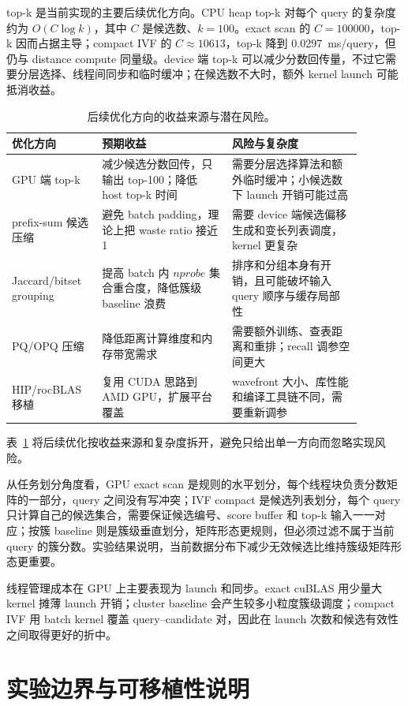 \documentclass[10pt,a4paper]{article}
\newcommand{\msq}{ms/query}
\begin{document}
top-k 是当前实现的主要后续优化方向。CPU heap top-k 对每个 query 的复杂度约为 $O(C\log k)$，其中 $C$ 是候选数、$k=100$。exact scan 的 $C=100000$，top-k 因而占据主导；compact IVF 的 $C\approx10613$，top-k 降到 0.0297~\msq{}，但仍与 distance compute 同量级。device 端 top-k 可以减少分数回传量，不过它需要分层选择、线程间同步和临时缓冲；在候选数不大时，额外 kernel launch 可能抵消收益。

\begin{table}[H]
\centering
\small
\caption{后续优化方向的收益来源与潜在风险。}
\label{tab:future-work}
\begin{tabular}{p{0.22\linewidth}p{0.33\linewidth}p{0.33\linewidth}}
\toprule
优化方向 & 预期收益 & 风险与复杂度 \\
\midrule
GPU 端 top-k & 减少候选分数回传，只输出 top-100；降低 host top-k 时间 & 需要分层选择算法和额外临时缓冲；小候选数下 launch 开销可能过高 \\
prefix-sum 候选压缩 & 避免 batch padding，理论上把 waste ratio 接近 1 & 需要 device 端候选偏移生成和变长列表调度，kernel 更复杂 \\
Jaccard/bitset grouping & 提高 batch 内 $nprobe$ 集合重合度，降低簇级 baseline 浪费 & 排序和分组本身有开销，且可能破坏输入 query 顺序与缓存局部性 \\
PQ/OPQ 压缩 & 降低距离计算维度和内存带宽需求 & 需要额外训练、查表距离和重排；recall 调参空间更大 \\
HIP/rocBLAS 移植 & 复用 CUDA 思路到 AMD GPU，扩展平台覆盖 & wavefront 大小、库性能和编译工具链不同，需要重新调参 \\
\bottomrule
\end{tabular}
\end{table}
表~\ref{tab:future-work} 将后续优化按收益来源和复杂度拆开，避免只给出单一方向而忽略实现风险。

从任务划分角度看，GPU exact scan 是规则的水平划分，每个线程块负责分数矩阵的一部分，query 之间没有写冲突；IVF compact 是候选列表划分，每个 query 只计算自己的候选集合，需要保证候选编号、score buffer 和 top-k 输入一一对应；按簇 baseline 则是簇级垂直划分，矩阵形态更规则，但必须过滤不属于当前 query 的簇分数。实验结果说明，当前数据分布下减少无效候选比维持簇级矩阵形态更重要。

线程管理成本在 GPU 上主要表现为 launch 和同步。exact cuBLAS 用少量大 kernel 摊薄 launch 开销；cluster baseline 会产生较多小粒度簇级调度；compact IVF 用 batch kernel 覆盖 query--candidate 对，因此在 launch 次数和候选有效性之间取得更好的折中。

\section{实验边界与可移植性说明}
\end{document}
